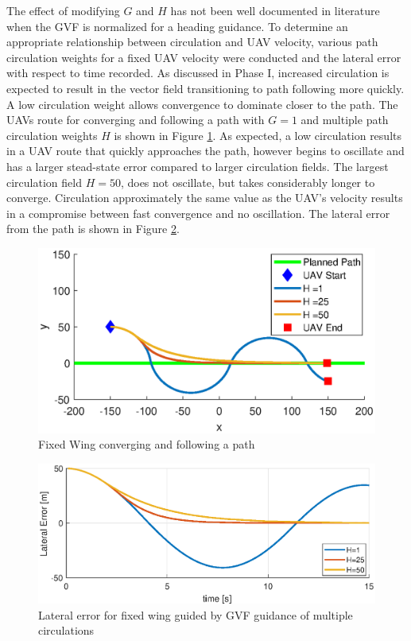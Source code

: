 \documentclass[numbered,pdftex]{ohio-etd}
\begin{document}
The effect of modifying $G$ and $H$ has not been well documented in literature when the GVF is normalized for a heading guidance. To determine an appropriate relationship between circulation and UAV velocity, various path circulation weights for a fixed UAV velocity were conducted and the lateral error with respect to time recorded. As discussed in Phase I, increased circulation is expected to result in the vector field transitioning to path following more quickly. A low circulation weight allows convergence to dominate closer to the path. The UAVs route for converging and following a path with $G=1$ and multiple path circulation weights $H$ is shown in Figure \ref{fig:uavPathMultipleHs}. As expected, a low circulation results in a UAV route that quickly approaches the path, however begins to oscillate and has a larger stead-state error compared to larger circulation fields. The largest circulation field $H=50$, does not oscillate, but takes considerably longer to converge. Circulation approximately the same value as the UAV's velocity results in a compromise between fast convergence and no oscillation. The lateral error from the path is shown in Figure \ref{fig:uavPathMultipleHsLateral}. 


\begin{figure}[H]
	\centering
	\includegraphics[trim=0 30 0 65,clip,width=14cm]{PaperFigures/Methods/pathMultipleHs}
	\caption{Fixed Wing converging and following a path}
	\label{fig:uavPathMultipleHs}
\end{figure}


\begin{figure}[H]
	\centering
	\includegraphics[trim=0 0 0 0,clip,width=16cm]{PaperFigures/Methods/lateralErrorVsTime}
	\caption{Lateral error for fixed wing guided by GVF guidance of multiple circulations}
	\label{fig:uavPathMultipleHsLateral}
\end{figure}
\end{document}

